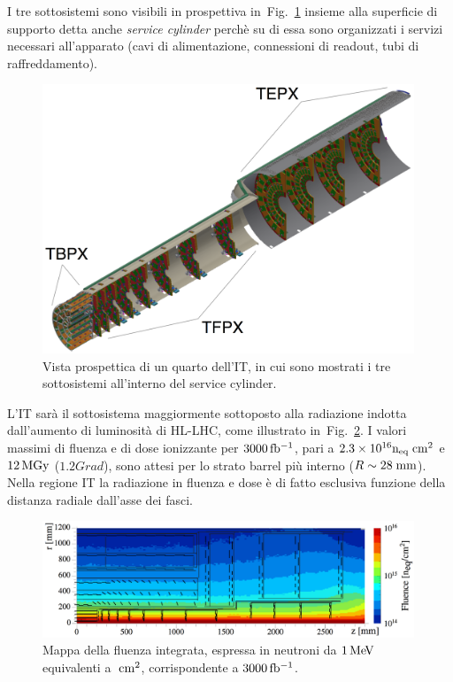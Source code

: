  I tre sottosistemi sono visibili in prospettiva in~Fig.~\ref{fig:ITPerspectiveView} insieme alla superficie di supporto detta anche {\em service cylinder} perch\`e su di essa sono organizzati i servizi necessari all'apparato (cavi di alimentazione, connessioni di readout, tubi di raffreddamento). 
\begin{figure}
\centering
\includegraphics[width=0.99\textwidth]{Immagini/ITPerspectiveView.PNG}
\caption{Vista prospettica di un quarto dell'IT, in cui sono mostrati i tre sottosistemi all'interno del service cylinder.}
\label{fig:ITPerspectiveView}
\end{figure}


L'IT sar\`a il sottosistema maggiormente sottoposto alla radiazione indotta dall'aumento di luminosit\`a di HL-LHC, come illustrato in~Fig.~\ref{fig:fluencemap}. I valori massimi di fluenza e di dose ionizzante per $3000{\rm \, fb^{-1}}$, pari a $2.3 \times 10^{16} \mathrm{n_{eq}\rm \; cm^2}$ e $12{\rm \, MGy}$ ($1.2 Grad$), sono attesi per lo strato barrel pi\`u interno ($R\sim28\rm \; mm$). Nella regione IT la radiazione in fluenza e dose \`e di fatto esclusiva funzione della distanza radiale dall'asse dei fasci. 
\begin{figure}
\centering
\includegraphics[width=0.99\textwidth]{Immagini/HLLHC_Fluence.PNG}
\caption{Mappa della fluenza integrata, espressa in neutroni da $1{\rm \, Me\kern-0.125em V}$ equivalenti a $\rm \; cm^2$, corrispondente a $3000{\rm \, fb^{-1}}$.}  
\label{fig:fluencemap}
\end{figure}

